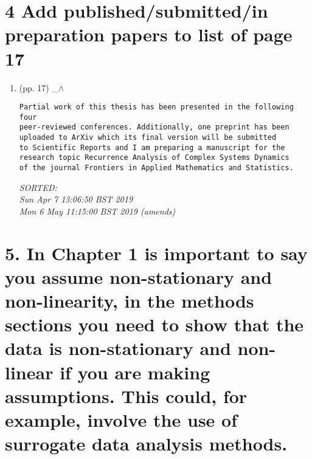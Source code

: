\documentclass[12pt]{article}
\begin{document}
\section*{4 
Add published/submitted/in preparation papers to list of page 17
}



%

\begin{enumerate}

\item  (pp. 17)  \_$\wedge$  

	\begin{verbatim}	
Partial work of this thesis has been presented in the following four 
peer-reviewed conferences. Additionally, one preprint has been 
uploaded to ArXiv which its final version will be submitted 
to Scientific Reports and I am preparing a manuscript for the 
research topic Recurrence Analysis of Complex Systems Dynamics
of the journal Frontiers in Applied Mathematics and Statistics.
\end{verbatim}
	\textit{
	SORTED:  \\
	Sun Apr  7 13:06:50 BST 2019 \\
	Mon  6 May 11:15:00 BST 2019 (amends)
	}
	\\


\end{enumerate}


\section*{5.  
In Chapter 1 is important to say you assume non-stationary and non-linearity,
in the methods sections you need to show that the data is non-stationary 
and non-linear if you are making assumptions. 
This could, for example, involve the use of surrogate data analysis
methods.
}
\end{document}
